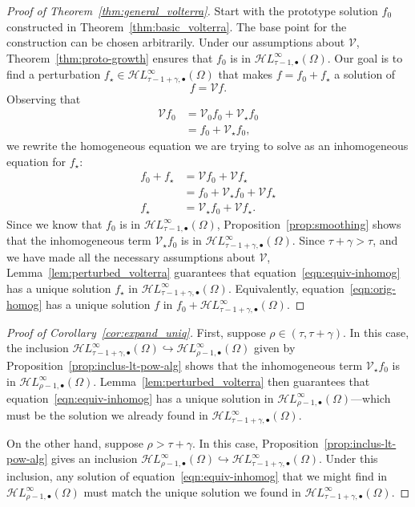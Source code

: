 \documentclass[review]{siamart220329}
\newcommand{\singexp}[2]{\mathcal{H}L^\infty_{#1, #2}}
\newcommand{\singexpalg}[1]{\singexp{#1}{\bullet}}
\newcommand{\volterra}{\mathcal{V}}
\newcommand{\hardpart}{\mathcal{V}_0}
\newcommand{\softpart}{\mathcal{V}_\star}
\newcommand{\solwhole}{f}
\newcommand{\solproto}{f_0}
\newcommand{\solptb}{f_\star}
\newcommand{\domain}{\Omega}
\begin{document}
\begin{proof}[Proof of Theorem~\ref{thm:general_volterra}]
Start with the prototype solution $\solproto$ constructed in Theorem~\ref{thm:basic_volterra}. The base point for the construction can be chosen arbitrarily. Under our assumptions about $\volterra$, Theorem~\ref{thm:proto-growth} ensures that $\solproto$ is in $\singexpalg{\tau-1}(\domain)$. Our goal is to find a perturbation $\solptb \in \singexpalg{\tau-1+\gamma}(\domain)$ that makes $\solwhole = \solproto + \solptb$ a solution of 
\begin{equation}\label{eqn:orig-homog}
\solwhole = \volterra \solwhole.
\end{equation}
Observing that
\begin{align*}
\volterra \solproto & = \hardpart\solproto + \softpart\solproto \\
& = \solproto + \softpart \solproto,
\end{align*}
we rewrite the homogeneous equation we are trying to solve as an inhomogeneous equation for $\solptb$:
\begin{align}
\solproto + \solptb & = \volterra\solproto + \volterra\solptb \nonumber \\
& = \solproto + \softpart\solproto + \volterra\solptb \nonumber \\
\solptb & = \softpart\solproto + \volterra\solptb. \label{eqn:equiv-inhomog}
\end{align}
Since we know that $\solproto$ is in $\singexpalg{\tau-1}(\domain)$, Proposition~\ref{prop:smoothing} shows that the inhomogeneous term $\softpart\solproto$ is in $\singexpalg{\tau-1+\gamma}(\domain)$. Since $\tau+\gamma > \tau$, and we have made all the necessary assumptions about $\volterra$, Lemma~\ref{lem:perturbed_volterra} guarantees that equation~\eqref{eqn:equiv-inhomog} has a unique solution $\solptb$ in $\singexpalg{\tau-1+\gamma}(\Omega)$. Equivalently, equation~\eqref{eqn:orig-homog} has a unique solution $f$ in $f_0 + \singexpalg{\tau-1+\gamma}(\domain)$.
\end{proof}
\color{blue}\begin{proof}[Proof of Corollary~\ref{cor:expand_uniq}]
First, suppose $\rho \in (\tau, \tau+\gamma)$. In this case, the inclusion $\singexpalg{\tau-1+\gamma}(\Omega) \hookrightarrow \singexpalg{\rho-1}(\Omega)$ given by Proposition~\ref{prop:inclus-lt-pow-alg} shows that the inhomogeneous term $\softpart\solproto$ is in $\singexpalg{\rho-1}(\Omega)$. Lemma~\ref{lem:perturbed_volterra} then guarantees that equation~\eqref{eqn:equiv-inhomog} has a unique solution in $\singexpalg{\rho-1}(\Omega)$---which must be the solution we already found in $\singexpalg{\tau-1+\gamma}(\Omega)$.

On the other hand, suppose $\rho > \tau+\gamma$. In this case, Proposition~\ref{prop:inclus-lt-pow-alg} gives an inclusion $\singexpalg{\rho-1}(\Omega) \hookrightarrow \singexpalg{\tau-1+\gamma}(\Omega)$. Under this inclusion, any solution of equation~\eqref{eqn:equiv-inhomog} that we might find in $\singexpalg{\rho-1}(\Omega)$ must match the unique solution we found in $\singexpalg{\tau-1+\gamma}(\Omega)$.
\end{proof}\color{black}
\end{document}
